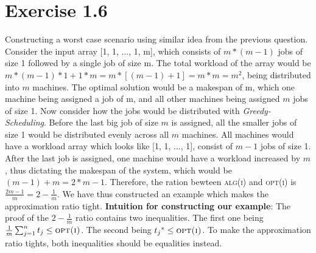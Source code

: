 \documentclass[11pt]{article}
\begin{document}
\section*{Exercise 1.6}
Constructing a worst case scenario using similar idea from the previous question. 
Consider the input array [1, 1, ..., 1, m], which consists of $m * (m - 1)$ jobs of size 1 followed by a single job of size m. 
The total workload of the array would be $m * (m - 1) * 1 + 1 * m = m * [(m - 1) + 1] = m * m = m ^ {2}$, being distributed into $m$ machines.
\newline
The optimal solution would be a makespan of m, which one machine being assigned a job of m, and all other machines being assigned $m$ jobs of size 1.
\newline
Now consider how the jobs would be distributed with \textit{Greedy-Scheduling}. Before the last big job of size $m$ is assigned, 
all the smaller jobs of size 1 would be distributed evenly across all $m$ machines. All machines would have a workload array which looks like [1, 1, ..., 1], 
consist of $m - 1$ jobs of size 1. After the last job is assigned, one machine would have a workload increased by $m$, thus dictating the makespan of the system, 
which would be $(m - 1) + m = 2 * m - 1$. 
\newline 
Therefore, the ration bewteen \textsc{alg(i)} and \textsc{opt(i)} is $\frac{2m - 1}{m} = 2 - \frac{1}{m}$. 
\newline
We have thus constructed an example which makes the approximation ratio tight.
\newline
\textbf{Intuition for constructing our example}: The proof of the $2 - \frac{1}{m}$ ratio contains two inequalities. The first one being
 $\frac{1}{m} \sum_{j=1}^{n}t_{j} \leq \textsc{opt(i)}$. The second being ${t_{j}}^{*} \leq \textsc{opt(i)}$. 
 To make the approximation ratio tights, both inequalities should be equalities instead.
\end{document}
